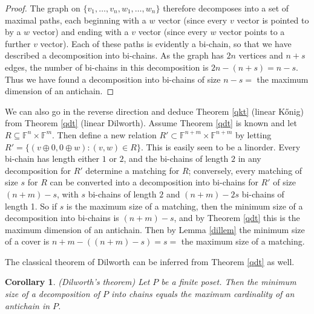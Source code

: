 \documentclass{amsart}
\newtheorem{cor}[thm]{Corollary}
\theoremstyle{definition}
\begin{document}
\begin{proof}
The graph on $\{v_1, \ldots, v_n, w_1, \ldots, w_n\}$ therefore decomposes into a set of maximal paths, each beginning with a $w$ vector (since every $v$ vector is pointed to by a $w$ vector) and ending with a $v$ vector (since every $w$ vector points to a further $v$ vector). Each of these paths is evidently a bi-chain, so that we have described a decomposition into bi-chains. As the graph has $2n$ vertices and $n + s$ edges, the number of bi-chains in this decomposition is $2n - (n + s) = n - s$. Thus we have found a decomposition into bi-chains of size $n - s =$ the maximum dimension of an antichain.
\end{proof}

We can also go in the reverse direction and deduce Theorem \ref{qkt} (linear Kőnig) from Theorem \ref{qdt} (linear Dilworth). Assume Theorem \ref{qdt} is known and let $R \subseteq \mathbb{F}^n \times \mathbb{F}^m$. Then define a new relation $R' \subset \mathbb{F}^{n + m} \times \mathbb{F}^{n + m}$ by letting $R' = \{(v \oplus 0,0 \oplus w): (v,w) \in R\}$. This is easily seen to be a linorder. Every bi-chain has length either $1$ or $2$, and the bi-chains of length $2$ in any decomposition for $R'$ determine a matching for $R$; conversely, every matching of size $s$ for $R$ can be converted into a decomposition into bi-chains for $R'$ of size $(n + m) - s$, with $s$ bi-chains of length $2$ and $(n + m) - 2s$ bi-chains of length 1. So if $s$ is the maximum size of a matching, then the minimum size of a decomposition into bi-chains is $(n + m) - s$, and by Theorem \ref{qdt} this is the maximum dimension of an antichain. Then by Lemma \ref{dillem} the minimum size of a cover is $n + m - ((n + m) - s) = s =$ the maximum size of a matching.

The classical theorem of Dilworth can be inferred from Theorem \ref{qdt} as well.

\begin{cor} (Dilworth's theorem)
Let $P$ be a finite poset. Then the minimum size of a decomposition of $P$ into chains equals the maximum cardinality of an antichain in $P$.
\end{cor}
\end{document}
